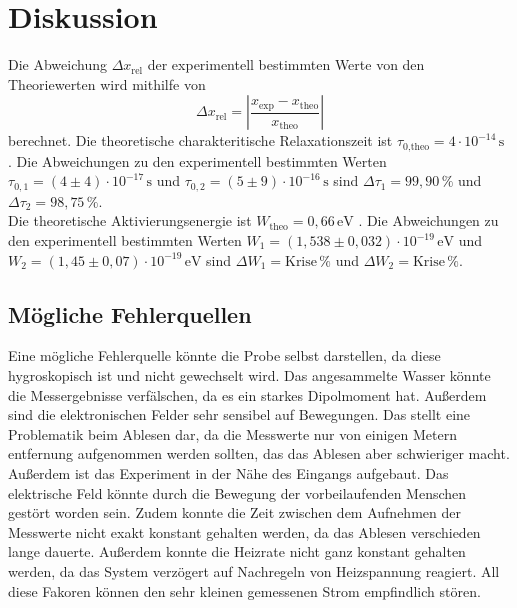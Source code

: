 \section{Diskussion}
\label{sec:Diskussion}
Die Abweichung $\Delta x_{\text{rel}}$ der experimentell bestimmten Werte von den Theoriewerten wird mithilfe von 
\begin{equation*}
    \Delta x_{\text{rel}} = \left| \frac{x_{\text{exp}} - x_{\text{theo}}}{x_{\text{theo}}}  \right|
\end{equation*}
berechnet. Die theoretische charakteritische Relaxationszeit ist $\tau_{\text{0,theo}} = 4 \cdot 10^{-14} \, \unit{\second}$ \cite{Irradiation}. Die Abweichungen zu den experimentell bestimmten Werten $\tau_{0,1} = \left(4\pm4\right)\cdot 10^{-17}\,\si{\second}$ und $\tau_{0,2} = \left(5\pm9\right)\cdot 10^{-16}\,\si{\second}$ sind $\Delta \tau_{1} = 99,90 \, \%$ und $\Delta \tau_{2} = 98,75 \, \%$.\\
Die theoretische Aktivierungsenergie ist $W_{\text{theo}} = 0,66 \, \unit{\electronvolt}$ \cite{Irradiation}. Die Abweichungen zu den experimentell bestimmten Werten $𝑊_{1} = (1, 538 \pm 0, 032) \cdot 10^{−19} \, \unit{\electronvolt}$ und
$𝑊_2 = (1, 45 \pm 0, 07) \cdot 10^{−19} \, \unit{\electronvolt}$ sind $\Delta W_{1} = \text{Krise} \, \%$ und $\Delta W_{2} = \text{Krise} \, \%$.

\subsection{Mögliche Fehlerquellen}
Eine mögliche Fehlerquelle könnte die Probe selbst darstellen, da diese hygroskopisch ist und nicht gewechselt wird. Das angesammelte Wasser könnte die Messergebnisse verfälschen, da es ein starkes Dipolmoment hat.  Außerdem sind die elektronischen Felder sehr sensibel auf Bewegungen. Das stellt eine Problematik beim Ablesen dar, da die Messwerte nur von einigen Metern entfernung aufgenommen werden sollten, das das Ablesen aber schwieriger macht. Außerdem ist das Experiment in der Nähe des Eingangs aufgebaut. Das elektrische Feld könnte durch die Bewegung der vorbeilaufenden Menschen gestört worden sein. 
Zudem konnte die Zeit zwischen dem Aufnehmen der Messwerte nicht exakt konstant gehalten werden, da das Ablesen verschieden lange dauerte. Außerdem konnte die Heizrate nicht ganz konstant gehalten werden, da das System verzögert auf Nachregeln von Heizspannung reagiert. All diese Fakoren können den sehr kleinen gemessenen Strom empfindlich stören. 